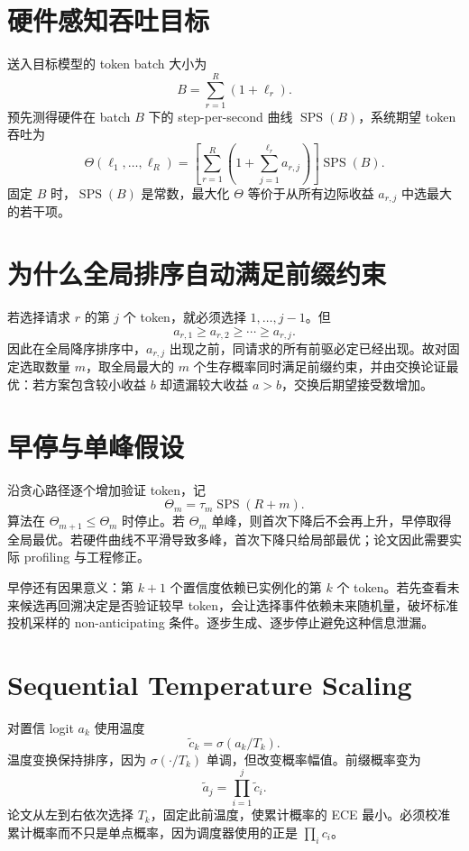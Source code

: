 \documentclass[UTF8,12pt,a4paper,fontset=none]{ctexart}
\numberwithin{equation}{section}
\begin{document}
\section{硬件感知吞吐目标}
送入目标模型的 token batch 大小为
\begin{equation}
 B=\sum_{r=1}^{R}(1+\ell_r).
\end{equation}
预先测得硬件在 batch $B$ 下的 step-per-second 曲线 $\operatorname{SPS}(B)$，系统期望 token 吞吐为
\begin{equation}
 \boxed{
 \Theta(\ell_1,\ldots,\ell_R)
 =\left[\sum_{r=1}^{R}\left(1+\sum_{j=1}^{\ell_r}a_{r,j}\right)\right]
 \operatorname{SPS}(B).
 }
\end{equation}
固定 $B$ 时，$\operatorname{SPS}(B)$ 是常数，最大化 $\Theta$ 等价于从所有边际收益 $a_{r,j}$ 中选最大的若干项。

\section{为什么全局排序自动满足前缀约束}
若选择请求 $r$ 的第 $j$ 个 token，就必须选择 $1,\ldots,j-1$。但
\begin{equation}
 a_{r,1}\ge a_{r,2}\ge\cdots\ge a_{r,j}.
\end{equation}
因此在全局降序排序中，$a_{r,j}$ 出现之前，同请求的所有前驱必定已经出现。故对固定选取数量 $m$，取全局最大的 $m$ 个生存概率同时满足前缀约束，并由交换论证最优：若方案包含较小收益 $b$ 却遗漏较大收益 $a>b$，交换后期望接受数增加。

\section{早停与单峰假设}
沿贪心路径逐个增加验证 token，记
\begin{equation}
 \Theta_m=\tau_m\operatorname{SPS}(R+m).
\end{equation}
算法在 $\Theta_{m+1}\le\Theta_m$ 时停止。若 $\Theta_m$ 单峰，则首次下降后不会再上升，早停取得全局最优。若硬件曲线不平滑导致多峰，首次下降只给局部最优；论文因此需要实际 profiling 与工程修正。

早停还有因果意义：第 $k+1$ 个置信度依赖已实例化的第 $k$ 个 token。若先查看未来候选再回溯决定是否验证较早 token，会让选择事件依赖未来随机量，破坏标准投机采样的 non-anticipating 条件。逐步生成、逐步停止避免这种信息泄漏。

\section{Sequential Temperature Scaling}
对置信 logit $a_k$ 使用温度
\begin{equation}
 \widetilde c_k=\sigma(a_k/T_k).
\end{equation}
温度变换保持排序，因为 $\sigma(\cdot/T_k)$ 单调，但改变概率幅值。前缀概率变为
\begin{equation}
 \widetilde a_j=\prod_{i=1}^{j}\widetilde c_i.
\end{equation}
论文从左到右依次选择 $T_k$，固定此前温度，使累计概率的 ECE 最小。必须校准累计概率而不只是单点概率，因为调度器使用的正是 $\prod_i c_i$。
\end{document}
